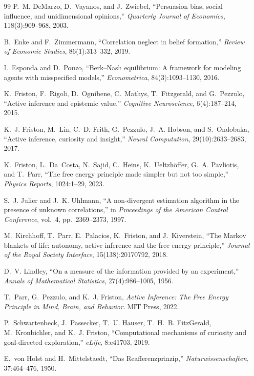 \documentclass[11pt]{article}
\theoremstyle{definition}
\theoremstyle{remark}
\begin{document}
\begin{thebibliography}{99}
 P.~M. DeMarzo, D.~Vayanos, and J.~Zwiebel, ``Persuasion
bias, social influence, and unidimensional opinions,'' \emph{Quarterly Journal
of Economics}, 118(3):909--968, 2003.

 B.~Enke and F.~Zimmermann, ``Correlation neglect in belief
formation,'' \emph{Review of Economic Studies}, 86(1):313--332, 2019.

 I.~Esponda and D.~Pouzo, ``Berk--Nash equilibrium: A
framework for modeling agents with misspecified models,'' \emph{Econometrica},
84(3):1093--1130, 2016.

 K.~Friston, F.~Rigoli, D.~Ognibene, C.~Mathys,
T.~Fitzgerald, and G.~Pezzulo, ``Active inference and epistemic value,''
\emph{Cognitive Neuroscience}, 6(4):187--214, 2015.

 K.~J. Friston, M.~Lin, C.~D. Frith, G.~Pezzulo,
J.~A. Hobson, and S.~Ondobaka, ``Active inference, curiosity and insight,''
\emph{Neural Computation}, 29(10):2633--2683, 2017.

 K.~Friston, L.~Da~Costa, N.~Sajid, C.~Heins,
K.~Ueltzh\"offer, G.~A. Pavliotis, and T.~Parr, ``The free energy principle made
simpler but not too simple,'' \emph{Physics Reports}, 1024:1--29, 2023.

 S.~J. Julier and J.~K. Uhlmann, ``A non-divergent estimation
algorithm in the presence of unknown correlations,'' in \emph{Proceedings of the
American Control Conference}, vol.~4, pp.~2369--2373, 1997.

 M.~Kirchhoff, T.~Parr, E.~Palacios, K.~Friston, and
J.~Kiverstein, ``The Markov blankets of life: autonomy, active inference and the
free energy principle,'' \emph{Journal of the Royal Society Interface},
15(138):20170792, 2018.

 D.~V. Lindley, ``On a measure of the information provided
by an experiment,'' \emph{Annals of Mathematical Statistics}, 27(4):986--1005,
1956.

 T.~Parr, G.~Pezzulo, and K.~J. Friston, \emph{Active
Inference: The Free Energy Principle in Mind, Brain, and Behavior}. MIT Press,
2022.

 P.~Schwartenbeck, J.~Passecker, T.~U. Hauser, T.~H.~B.
FitzGerald, M.~Kronbichler, and K.~J. Friston, ``Computational mechanisms of
curiosity and goal-directed exploration,'' \emph{eLife}, 8:e41703, 2019.

 E.~von Holst and H.~Mittelstaedt, ``Das
Reafferenzprinzip,'' \emph{Naturwissenschaften}, 37:464--476, 1950.

\end{thebibliography}
\end{document}
